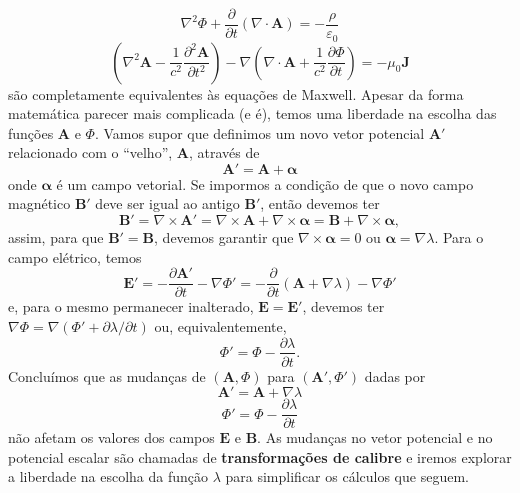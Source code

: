 \documentclass{article}
\begin{document}
\begin{equation}
    \nabla^2 \Phi + \frac{\partial}{\partial t}(\nabla\cdot\mathbf{A}) = - \frac{\rho}{\varepsilon_0}
    \label{eq88}
\end{equation}
\begin{equation}
    \left( \nabla^2 \mathbf{A} - \frac{1}{c^2}\frac{\partial^2 \mathbf{A}}{\partial t^2}\right) - \nabla\left( \nabla\cdot\mathbf{A} + \frac{1}{c^2}\frac{\partial\Phi}{\partial t} \right) = -\mu_0\mathbf{J}
    \label{eq99}
\end{equation}
são completamente equivalentes às equações de Maxwell. Apesar da forma matemática parecer mais complicada (e é), temos uma liberdade na escolha das funções $\mathbf{A}$ e $\Phi$. Vamos supor que definimos um novo vetor potencial $\mathbf{A}'$ relacionado com o ``velho'', $\mathbf{A}$, através de
\begin{equation}
    \mathbf{A}' = \mathbf{A} + \mathbf{\alpha}
\end{equation}
onde $\mathbf{\alpha}$ é um campo vetorial. Se impormos a condição de que o novo campo magnético $\mathbf{B}'$ deve ser igual ao antigo $\mathbf{B}'$, então devemos ter
\begin{equation}
    \mathbf{B}' = \nabla\times\mathbf{A}' = \nabla\times\mathbf{A} + \nabla\times\mathbf{\alpha} = \mathbf{B} + \nabla\times\mathbf{\alpha},
\end{equation}
assim, para que $\mathbf{B}' = \mathbf{B}$, devemos garantir que $\nabla\times\mathbf{\alpha} = 0$ ou $\mathbf{\alpha} = \nabla\lambda$. Para o campo elétrico, temos
\begin{equation}
    \mathbf{E}' = -\frac{\partial\mathbf{A}'}{\partial t} -\nabla\Phi' = -\frac{\partial}{\partial t}(\mathbf{A}+\nabla\lambda) - \nabla\Phi'
\end{equation}
e, para o mesmo permanecer inalterado, $\mathbf{E} = \mathbf{E}'$, devemos ter $\nabla\Phi = \nabla(\Phi' +\partial\lambda/\partial t)$ ou, equivalentemente,
\begin{equation}
    \Phi' = \Phi - \frac{\partial\lambda}{\partial t}.
\end{equation}
Concluímos que as mudanças de $(\mathbf{A},\Phi)$ para $(\mathbf{A}',\Phi')$ dadas por
\begin{equation}
    \mathbf{A}' = \mathbf{A} + \nabla\lambda
\end{equation}
\begin{equation}
    \Phi' = \Phi - \frac{\partial\lambda}{\partial t}
\end{equation}
não afetam os valores dos campos $\mathbf{E}$ e $\mathbf{B}$. As mudanças no vetor potencial e no potencial escalar são chamadas de \textbf{transformações de calibre} e iremos explorar a liberdade na escolha da função $\lambda$ para simplificar os cálculos que seguem.
\end{document}
